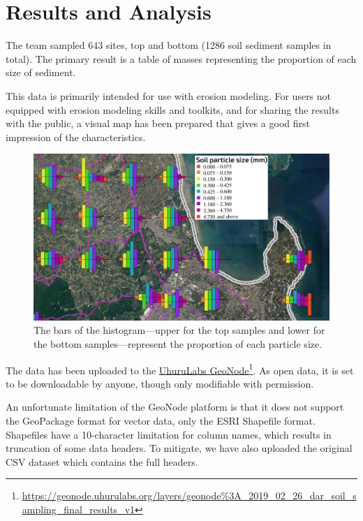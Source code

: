 \documentclass[a4paper,12pt]{article}
\begin{document}
\newpage 
\section{Results and Analysis}
\label{resultsandanalysis}
The team sampled 643 sites, top and bottom (1286 soil sediment samples in total). The primary result is a table of masses representing the proportion of each size of sediment.

This data is primarily intended for use with erosion modeling. For users not equipped with erosion modeling skills and toolkits, and for sharing the results with the public, a visual map has been prepared that gives a good first impression of the characteristics.

\begin{figure}[h]
  \caption{The bars of the histogram---upper for the top samples and lower for the bottom samples---represent the proportion of each particle size.}
  \centering
  \includegraphics[width=1.1\textwidth]{soil_map_detail_peninsula_with_legend}
\end{figure}

The data has been uploaded to the \href{https://geonode.uhurulabs.org/layers/geonode\%3A_2019_02_26_dar_soil_sampling_final_results_v1}{UhuruLabs GeoNode}\footnote{\url {https://geonode.uhurulabs.org/layers/geonode\%3A_2019_02_26_dar_soil_sampling_final_results_v1}}. As open data, it is set to be downloadable by anyone, though only modifiable with permission.

An unfortunate limitation of the GeoNode platform is that it does not support the GeoPackage format for vector data, only the ESRI Shapefile format. Shapefiles have a 10-character limitation for column names, which results in truncation of some data headers. To mitigate, we have also uploaded the original CSV dataset which contains the full headers. 
\end{document}
